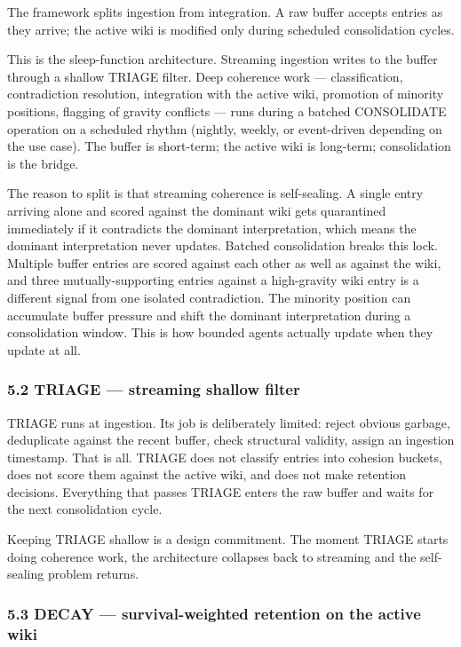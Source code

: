 \documentclass[
  11pt,
]{article}
\begin{document}
The framework splits ingestion from integration. A raw buffer accepts
entries as they arrive; the active wiki is modified only during
scheduled consolidation cycles.

This is the sleep-function architecture. Streaming ingestion writes to
the buffer through a shallow TRIAGE filter. Deep coherence work ---
classification, contradiction resolution, integration with the active
wiki, promotion of minority positions, flagging of gravity conflicts ---
runs during a batched CONSOLIDATE operation on a scheduled rhythm
(nightly, weekly, or event-driven depending on the use case). The buffer
is short-term; the active wiki is long-term; consolidation is the
bridge.

The reason to split is that streaming coherence is self-sealing. A
single entry arriving alone and scored against the dominant wiki gets
quarantined immediately if it contradicts the dominant interpretation,
which means the dominant interpretation never updates. Batched
consolidation breaks this lock. Multiple buffer entries are scored
against each other as well as against the wiki, and three
mutually-supporting entries against a high-gravity wiki entry is a
different signal from one isolated contradiction. The minority position
can accumulate buffer pressure and shift the dominant interpretation
during a consolidation window. This is how bounded agents actually
update when they update at all.

\hypertarget{triage-streaming-shallow-filter}{%
\subsubsection{5.2 TRIAGE --- streaming shallow
filter}\label{triage-streaming-shallow-filter}}

TRIAGE runs at ingestion. Its job is deliberately limited: reject
obvious garbage, deduplicate against the recent buffer, check structural
validity, assign an ingestion timestamp. That is all. TRIAGE does not
classify entries into cohesion buckets, does not score them against the
active wiki, and does not make retention decisions. Everything that
passes TRIAGE enters the raw buffer and waits for the next consolidation
cycle.

Keeping TRIAGE shallow is a design commitment. The moment TRIAGE starts
doing coherence work, the architecture collapses back to streaming and
the self-sealing problem returns.

\hypertarget{decay-survival-weighted-retention-on-the-active-wiki}{%
\subsubsection{5.3 DECAY --- survival-weighted retention on the active
wiki}\label{decay-survival-weighted-retention-on-the-active-wiki}}
\end{document}
